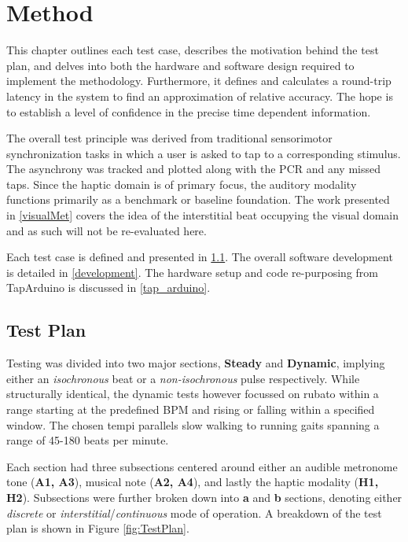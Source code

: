 \chapter{Method}
This chapter outlines each test case, describes the motivation behind the test plan, and delves into both the hardware and software design required to implement the methodology. Furthermore, it defines and calculates a round-trip latency in the system to find an approximation of relative accuracy. The hope is to establish a level of confidence in the precise time dependent information.

The overall test principle was derived from traditional sensorimotor synchronization tasks in which a user is asked to tap to a corresponding stimulus. The asynchrony was tracked and plotted along with the PCR and any missed taps. Since the haptic domain is of primary focus, the auditory modality functions primarily as a benchmark or baseline foundation. The work presented in \ref{visualMet} covers the idea of the interstitial beat occupying the visual domain and as such will not be re-evaluated here.


Each test case is defined and presented in \ref{testPlan}. The overall software development is detailed in \ref{development}. The hardware setup and code re-purposing from TapArduino is discussed in \ref{tap_arduino}.

\section{Test Plan} \label{testPlan}
Testing was divided into two major sections, \textbf{Steady} and \textbf{Dynamic}, implying either an \textit{isochronous} beat or a \textit{non-isochronous} pulse respectively. While structurally identical, the dynamic tests however focussed on rubato within a range starting at the predefined BPM and rising or falling within a specified window. The chosen tempi parallels slow walking to running gaits spanning a range of 45-180 beats per minute.

Each section had three subsections centered around either an audible metronome tone (\textbf{A1, A3}), musical note (\textbf{A2, A4}), and lastly the haptic modality (\textbf{H1, H2}). Subsections were further broken down into \textbf{a} and \textbf{b} sections, denoting either \textit{discrete} or \textit{interstitial}/\textit{continuous} mode of operation. A breakdown of the test plan is shown in Figure \ref{fig:TestPlan}.

